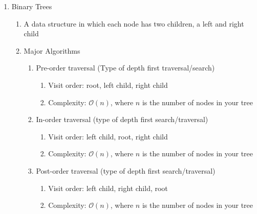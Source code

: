 \documentclass [12pt, executivepaper]{article}
\begin{document}
\begin{enumerate}

\item Binary Trees

\begin{enumerate}

\item A data structure in which each node has two children, a left and right child

\item Major Algorithms

\begin{enumerate}

\item Pre-order traversal (Type of depth first traversal/search)

\begin{enumerate}

\item Visit order: root, left child, right child

\item Complexity: $\mathcal{O}(n)$, where $n$ is the number of nodes in your tree

\end{enumerate}

\item In-order traversal (type of depth first search/traversal)

\begin{enumerate}

\item Visit order: left child, root, right child

\item Complexity: $\mathcal{O}(n)$, where $n$ is the number of nodes in your tree

\end{enumerate}

\item Post-order traversal (type of depth first search/traversal)

\begin{enumerate}

\item Visit order: left child, right child, root

\item Complexity: $\mathcal{O}(n)$, where $n$ is the number of nodes in your tree

\end{enumerate}


\end{enumerate}
\end{enumerate}
\end{enumerate}
\end{document}
